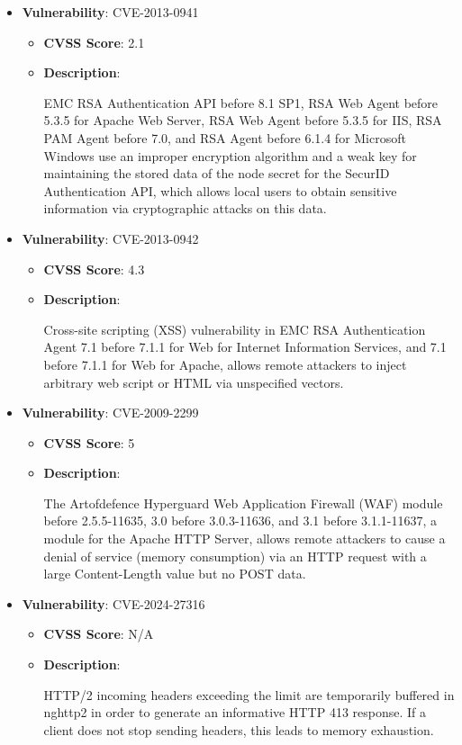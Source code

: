\documentclass{article}
\begin{document}
\begin{itemize}
        \item \textbf{Vulnerability}: CVE-2013-0941
        \begin{itemize}
            \item \textbf{CVSS Score}:  2.1 
            \item \textbf{Description}:
            \parbox[t]{0.9\linewidth}{
                \ttfamily EMC RSA Authentication API before 8.1 SP1, RSA Web Agent before 5.3.5 for Apache Web Server, RSA Web Agent before 5.3.5 for IIS, RSA PAM Agent before 7.0, and RSA Agent before 6.1.4 for Microsoft Windows use an improper encryption algorithm and a weak key for maintaining the stored data of the node secret for the SecurID Authentication API, which allows local users to obtain sensitive information via cryptographic attacks on this data.
            }
        \end{itemize}
    
        \item \textbf{Vulnerability}: CVE-2013-0942
        \begin{itemize}
            \item \textbf{CVSS Score}:  4.3 
            \item \textbf{Description}:
            \parbox[t]{0.9\linewidth}{
                \ttfamily Cross-site scripting (XSS) vulnerability in EMC RSA Authentication Agent 7.1 before 7.1.1 for Web for Internet Information Services, and 7.1 before 7.1.1 for Web for Apache, allows remote attackers to inject arbitrary web script or HTML via unspecified vectors.
            }
        \end{itemize}
    
        \item \textbf{Vulnerability}: CVE-2009-2299
        \begin{itemize}
            \item \textbf{CVSS Score}:  5 
            \item \textbf{Description}:
            \parbox[t]{0.9\linewidth}{
                \ttfamily The Artofdefence Hyperguard Web Application Firewall (WAF) module before 2.5.5-11635, 3.0 before 3.0.3-11636, and 3.1 before 3.1.1-11637, a module for the Apache HTTP Server, allows remote attackers to cause a denial of service (memory consumption) via an HTTP request with a large Content-Length value but no POST data.
            }
        \end{itemize}
    
        \item \textbf{Vulnerability}: CVE-2024-27316
        \begin{itemize}
            \item \textbf{CVSS Score}:  N/A 
            \item \textbf{Description}:
            \parbox[t]{0.9\linewidth}{
                \ttfamily HTTP/2 incoming headers exceeding the limit are temporarily buffered in nghttp2 in order to generate an informative HTTP 413 response. If a client does not stop sending headers, this leads to memory exhaustion.
            }
        \end{itemize}
    

\end{itemize}
\end{document}
